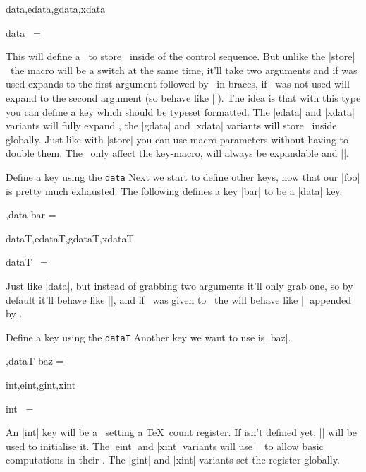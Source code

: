 \begin{function}[module=expkv-def type]{data,edata,gdata,xdata}
  \begin{syntax}
    data \key\ =  
  \end{syntax}
  This will define a \Vkey\ to store \val\ inside of the control sequence. But
  unlike the |store| \type\ the macro  will be a switch at the same
  time, it'll take two arguments and if  was used expands to the first
  argument followed by \val\ in braces, if \key\ was not used  will
  expand to the second argument (so behave like |\@secondoftwo|). The idea is
  that with this type you can define a key which should be typeset formatted.
  The |edata| and |xdata| variants will fully expand \val, the |gdata| and
  |xdata| variants will store \val\ inside  globally. Just like with
  |store| you can use macro parameters without having to double them. The
  \prefixes\ only affect the key-macro,  will always be expandable and
  |\long|.
\end{function}
\begin{example}{Define a key using the \texttt{data} \type}
  Next we start to define other keys, now that our |foo| is pretty much
  exhausted. The following defines a key |bar| to be a |data| key.
  \begin{enverb}
        ,data bar = \examplebar
  \end{enverb}
\end{example}

\begin{function}[module=expkv-def type]{dataT,edataT,gdataT,xdataT}
  \begin{syntax}
    dataT \key\ =  
  \end{syntax}
  Just like |data|, but instead of  grabbing two arguments it'll only
  grab one, so by default it'll behave like |\@gobble|, and if \val\ was given
  to \key\ the  will behave like |\@firstofone| appended by
  .
\end{function}
\begin{example}{Define a key using the \texttt{dataT} \type}
  Another key we want to use is |baz|.
  \begin{enverb}
        ,dataT baz = \examplebaz
  \end{enverb}
\end{example}

\begin{function}[module=expkv-def type]{int,eint,gint,xint}
  \begin{syntax}
    int \key\ =  
  \end{syntax}
  An |int| key will be a \Vkey\ setting a \TeX\ count register. If 
  isn't defined yet, |\newcount| will be used to initialise it. The |eint| and
  |xint| variants will use |\numexpr| to allow basic computations in their \val.
  The |gint| and |xint| variants set the register globally.
\end{function}

